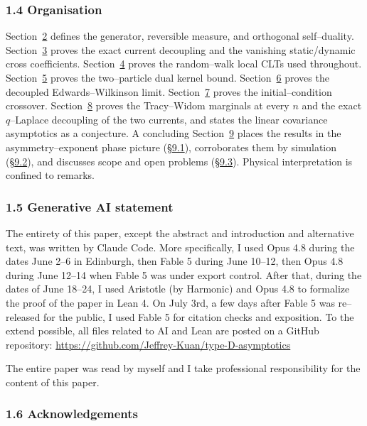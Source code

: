 \documentclass[11pt]{article}
\theoremstyle{plain}
\theoremstyle{definition}
\theoremstyle{remark}
\begin{document}
\subsubsection{1.4 Organisation}\label{sec_introorg}
Section~\hyperref[sec_model]{2} defines the generator, reversible measure, and orthogonal
self--duality. Section~\hyperref[sec_decouple]{3} proves the exact current decoupling and the
vanishing static/dynamic cross coefficients. Section~\hyperref[sec_lclt]{4} proves the
random--walk local CLTs used throughout. Section~\hyperref[sec_kernel]{5} proves the
two--particle dual kernel bound. Section~\hyperref[sec_ew]{6} proves the decoupled
Edwards--Wilkinson limit. Section~\hyperref[sec_cross]{7} proves the initial--condition
crossover. Section~\hyperref[sec_tw]{8} proves the Tracy--Widom marginals at every $n$ and
the exact $q$--Laplace decoupling of the two currents, and states the linear
covariance asymptotics as a conjecture. A concluding Section~\hyperref[sec_summary]{9} places the
results in the asymmetry--exponent phase picture (\S\hyperref[sec_phase]{9.1}), corroborates them
by simulation (\S\hyperref[sec_numerics]{9.2}), and discusses scope and open problems
(\S\hyperref[sec_disc]{9.3}). Physical interpretation is confined to remarks.

\subsubsection{1.5 Generative AI statement}
The entirety of this paper, except the abstract and introduction and alternative text, was written by Claude Code. More specifically, I used Opus 4.8 during the dates June 2--6 in Edinburgh, then Fable 5 during June 10--12, then Opus 4.8 during June 12--14 when Fable 5 was under export control. After that, during the dates of June 18--24, I used Aristotle (by Harmonic) and Opus 4.8 to formalize the proof of the paper in Lean 4. On July 3rd, a few days after Fable 5 was re--released for the public, I used Fable 5 for citation checks and exposition. To the extend possible, all files related to AI and Lean are posted on a GitHub repository: \url{https://github.com/Jeffrey-Kuan/type-D-asymptotics}

The entire paper was read by myself and I take professional responsibility for the content of this paper. 

\subsubsection{1.6 Acknowledgements}
\end{document}
